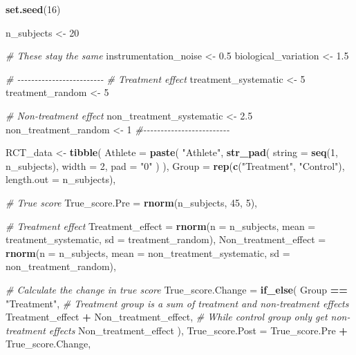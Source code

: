 \documentclass[
]{book}
\newenvironment{Shaded}{\begin{snugshade}}{\end{snugshade}}
\newcommand{\CommentTok}[1]{\textcolor[rgb]{0.56,0.35,0.01}{\textit{#1}}}
\newcommand{\DataTypeTok}[1]{\textcolor[rgb]{0.13,0.29,0.53}{#1}}
\newcommand{\DecValTok}[1]{\textcolor[rgb]{0.00,0.00,0.81}{#1}}
\newcommand{\FloatTok}[1]{\textcolor[rgb]{0.00,0.00,0.81}{#1}}
\newcommand{\KeywordTok}[1]{\textcolor[rgb]{0.13,0.29,0.53}{\textbf{#1}}}
\newcommand{\NormalTok}[1]{#1}
\newcommand{\OperatorTok}[1]{\textcolor[rgb]{0.81,0.36,0.00}{\textbf{#1}}}
\newcommand{\StringTok}[1]{\textcolor[rgb]{0.31,0.60,0.02}{#1}}
\begin{document}
\begin{Shaded}
\begin{Highlighting}[]
\KeywordTok{set.seed}\NormalTok{(}\DecValTok{16}\NormalTok{)}

\NormalTok{n\_subjects <{-}}\StringTok{ }\DecValTok{20}

\CommentTok{\# These stay the same}
\NormalTok{instrumentation\_noise <{-}}\StringTok{ }\FloatTok{0.5}
\NormalTok{biological\_variation <{-}}\StringTok{ }\FloatTok{1.5}

\CommentTok{\# {-}{-}{-}{-}{-}{-}{-}{-}{-}{-}{-}{-}{-}{-}{-}{-}{-}{-}{-}{-}{-}{-}{-}{-}{-}}
\CommentTok{\# Treatment effect}
\NormalTok{treatment\_systematic <{-}}\StringTok{ }\DecValTok{5}
\NormalTok{treatment\_random <{-}}\StringTok{ }\DecValTok{5}

\CommentTok{\# Non{-}treatment effect}
\NormalTok{non\_treatment\_systematic <{-}}\StringTok{ }\FloatTok{2.5}
\NormalTok{non\_treatment\_random <{-}}\StringTok{ }\DecValTok{1}
\CommentTok{\#{-}{-}{-}{-}{-}{-}{-}{-}{-}{-}{-}{-}{-}{-}{-}{-}{-}{-}{-}{-}{-}{-}{-}{-}{-}}

\NormalTok{RCT\_data <{-}}\StringTok{ }\KeywordTok{tibble}\NormalTok{(}
  \DataTypeTok{Athlete =} \KeywordTok{paste}\NormalTok{(}
    \StringTok{"Athlete"}\NormalTok{,}
    \KeywordTok{str\_pad}\NormalTok{(}
      \DataTypeTok{string =} \KeywordTok{seq}\NormalTok{(}\DecValTok{1}\NormalTok{, n\_subjects),}
      \DataTypeTok{width =} \DecValTok{2}\NormalTok{,}
      \DataTypeTok{pad =} \StringTok{"0"}
\NormalTok{    )}
\NormalTok{  ),}
  \DataTypeTok{Group =} \KeywordTok{rep}\NormalTok{(}\KeywordTok{c}\NormalTok{(}\StringTok{"Treatment"}\NormalTok{, }\StringTok{"Control"}\NormalTok{), }\DataTypeTok{length.out =}\NormalTok{ n\_subjects),}

  \CommentTok{\# True score}
  \DataTypeTok{True\_score.Pre =} \KeywordTok{rnorm}\NormalTok{(n\_subjects, }\DecValTok{45}\NormalTok{, }\DecValTok{5}\NormalTok{),}

  \CommentTok{\# Treatment effect}
  \DataTypeTok{Treatment\_effect =} \KeywordTok{rnorm}\NormalTok{(}\DataTypeTok{n =}\NormalTok{ n\_subjects, }\DataTypeTok{mean =}\NormalTok{ treatment\_systematic, }\DataTypeTok{sd =}\NormalTok{ treatment\_random),}
  \DataTypeTok{Non\_treatment\_effect =} \KeywordTok{rnorm}\NormalTok{(}\DataTypeTok{n =}\NormalTok{ n\_subjects, }\DataTypeTok{mean =}\NormalTok{ non\_treatment\_systematic, }\DataTypeTok{sd =}\NormalTok{ non\_treatment\_random),}

  \CommentTok{\# Calculate the change in true score}
  \DataTypeTok{True\_score.Change =} \KeywordTok{if\_else}\NormalTok{(}
\NormalTok{    Group }\OperatorTok{==}\StringTok{ "Treatment"}\NormalTok{,}
    \CommentTok{\# Treatment group is a sum of treatment and non{-}treatment effects}
\NormalTok{    Treatment\_effect }\OperatorTok{+}\StringTok{ }\NormalTok{Non\_treatment\_effect,}
    \CommentTok{\# While control group only get non{-}treatment effects}
\NormalTok{    Non\_treatment\_effect}
\NormalTok{  ),}
  \DataTypeTok{True\_score.Post =}\NormalTok{ True\_score.Pre }\OperatorTok{+}\StringTok{ }\NormalTok{True\_score.Change,}


\end{Highlighting}
\end{Shaded}
\end{document}

